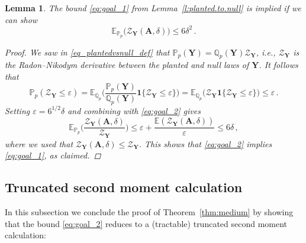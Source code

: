 \documentclass[11pt,reqno]{amsart}
\theoremstyle{plain}
\newtheorem{lemma}[theorem]{Lemma}
\theoremstyle{definition}
\theoremstyle{remark}
\newcommand{\E}{\mathbb{E}}
\renewcommand{\epsilon}{\varepsilon}
\newcommand{\Q}{\mathbb{Q}}
\newcommand{\PP}{\mathbb{P}}
\newcommand{\EE}{\mathbb{E}}
\newcommand{\bA}{\mathbf{A}}
\newcommand{\bY}{\mathbf{Y}}
\newcommand{\cZ}{\mathcal{Z}}
\begin{document}
\begin{lemma}\label{lem:planting_first}
The bound \eqref{eq:goal_1} from Lemma~\ref{l:planted.to.null} is implied if we can show
	\begin{equation}\label{eq:goal_2}
    \EE_{\PP_p}\Big(\cZ_{\bY}(\bA,\delta)
 	\Big)
    \leq 6\delta^2\,. 
    \end{equation}

\begin{proof}We saw in \eqref{eq_plantedvsnull_def}
that $\PP_p(\bY)=\Q_p(\bY)\cZ_{\bY}$, i.e., $\cZ_{\bY}$ is the Radon--Nikodym derivative between the planted and null laws of $\bY$. It follows that
	\[
	\PP_p( \cZ_{\bY} \leq \epsilon )   
	=\E_{\Q_p}\bigg( \frac{\PP_p(\bY)}{\Q_p(\bY)} \mathbf{1}\{
    	\cZ_{\bY}\le\epsilon \}\bigg) 
    	= \E_{\Q_p}\Big( \cZ_{\bY}
    	\mathbf{1}\{\cZ_{\bY}\le\epsilon\}\Big)
    \le\epsilon\,.\]
Setting $\epsilon=6^{1/2}\delta$ and combining with \eqref{eq:goal_2} gives
	\[\EE_{\PP_p}\bigg(
    \frac{\cZ_{\bY}(\bA,\delta)}{\cZ_{\bY}} \bigg)
	\leq
	\epsilon
	+\frac{\EE(
 	\cZ_{\bY}(\bA,\delta)
   	)}{\epsilon}
    \le 6\delta\,, \]
where we used that $\cZ_{\bY}(\bA,\delta) \le \cZ_{\bY}$. This shows that
\eqref{eq:goal_2} implies \eqref{eq:goal_1}, as claimed.
\end{proof}
\end{lemma}

\subsection{Truncated second moment calculation}\label{sec:trunc}

In this subsection we conclude the proof of Theorem~\ref{thm:medium} by showing that the bound \eqref{eq:goal_2} reduces to a (tractable) truncated second moment calculation: 
\end{document}
